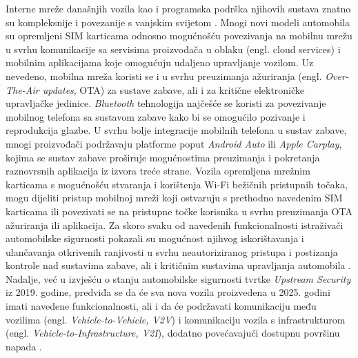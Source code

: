 \documentclass[times, utf8, diplomski, numeric]{fer}
\begin{document}
Interne mreže današnjih vozila kao i programska podrška njihovih sustava znatno su kompleksnije i povezanije s vanjskim svijetom \cite{huq2020driving}. Mnogi novi modeli automobila su opremljeni SIM karticama odnosno mogućnošću povezivanja na mobilnu mrežu u svrhu komunikacije sa servisima proizvođača u oblaku (engl. cloud services) i mobilnim aplikacijama koje omogućuju udaljeno upravljanje vozilom. Uz nevedeno, mobilna mreža koristi se i u svrhu preuzimanja ažuriranja (engl. \textit{Over-The-Air updates}, OTA) za sustave zabave, ali i za kritične elektroničke upravljačke jedinice. \textit{Bluetooth} tehnologija najčešće se koristi za povezivanje mobilnog telefona sa sustavom zabave kako bi se omogućilo pozivanje i reprodukcija glazbe. U svrhu bolje integracije mobilnih telefona u sustav zabave, mnogi proizvođači podržavaju platforme poput \textit{Android Auto} ili \textit{Apple Carplay}, kojima se sustav zabave proširuje mogućnostima preuzimanja i pokretanja raznovrsnih aplikacija iz izvora treće strane. Vozila opremljena mrežnim karticama s mogućnošću stvaranja i korištenja Wi-Fi bežičnih pristupnih točaka, mogu dijeliti pristup mobilnoj mreži koji ostvaruju s prethodno navedenim SIM karticama ili povezivati se na pristupne točke korisnika u svrhu preuzimanja OTA ažuriranja ili aplikacija. Za skoro svaku od navedenih funkcionalnosti istraživači automobilske sigurnosti pokazali su mogućnost njihvog iskorištavanja i ulančavanja otkrivenih ranjivosti u svrhu neautoriziranog pristupa i postizanja kontrole nad sustavima zabave, ali i kritičnim sustavima upravljanja automobila \cite{nie2017free, nie2018over, cai20190, tencent2018bmw, miller2015remote, curry2023web}. Nadalje, već u izvješću o stanju automobilske sigurnosti tvrtke \textit{Upstream Security} iz 2019. godine, predviđa se da će sva nova vozila proizvedena u 2025. godini imati navedene funkcionalnosti, ali i da će podržavati komunikaciju među vozilima (engl. \textit{Vehicle-to-Vehicle, V2V}) i komunikaciju vozila s infrastrukturom (engl. \textit{Vehicle-to-Infrastructure, V2I}), dodatno povećavajući dostupnu površinu napada \cite{upstream2019report}.
\end{document}
